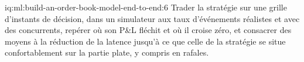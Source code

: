 \begin{solution}{iq:ml:build-an-order-book-model-end-to-end:6}
Trader la stratégie sur une grille d'instants de décision, dans un simulateur aux taux d'événements réalistes et avec des concurrents, repérer où son P\&L
fléchit et où il croise zéro, et consacrer des moyens à la réduction de la latence jusqu'à ce que celle de la stratégie se situe confortablement sur la partie plate, y compris en rafales.
\end{solution}
